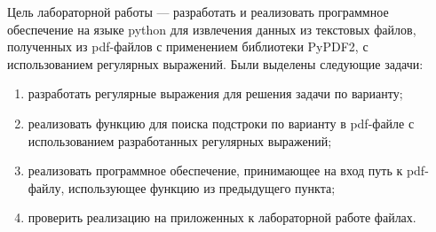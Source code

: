 
Цель лабораторной работы — разработать и реализовать программное обеспечение на языке python для извлечения данных из
текстовых файлов, полученных из pdf-файлов с применением библиотеки PyPDF2, с использованием регулярных выражений.
Были выделены следующие задачи:
\begin{enumerate}
	\item разработать регулярные выражения для решения задачи по варианту;
	\item реализовать функцию для поиска подстроки по варианту в pdf-файле с использованием разработанных регулярных выражений;
	\item реализовать программное обеспечение, принимающее на вход путь к pdf-файлу, использующее функцию из предыдущего пункта;
	\item проверить реализацию на приложенных к лабораторной работе файлах.
\end{enumerate}